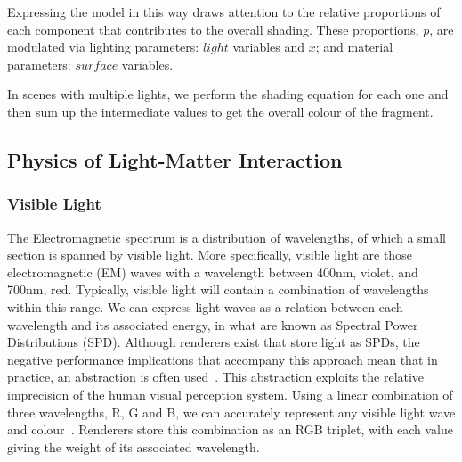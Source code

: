 Expressing the model in this way draws attention to the relative proportions of each component that contributes to the overall shading. These proportions, \begin{math}p\end{math}, are modulated via lighting parameters:  \begin{math}light\end{math} variables and \begin{math}x\end{math}; and material parameters: \begin{math}surface\end{math} variables.

In scenes with multiple lights, we perform the shading equation for each one and then sum up the intermediate values to get the overall colour of the fragment.

\subsection{Physics of Light-Matter Interaction} \label{PhysicsOfLightMatterInteraction}

\subsubsection{Visible Light}

The Electromagnetic spectrum is a distribution of wavelengths, of which a small section is spanned by visible light. More specifically, visible light are those electromagnetic (EM) waves with a wavelength between 400nm, violet, and 700nm, red. Typically, visible light will contain a combination of wavelengths within this range. We can express light waves as a relation between each wavelength and its associated energy, in what are known as Spectral Power Distributions (SPD). Although renderers exist that store light as SPDs, the negative performance implications that accompany this approach mean that in practice, an abstraction is often used~\cite{SpectralRendering}. This abstraction exploits the relative imprecision of the human visual perception system. Using a linear combination of three wavelengths, R, G and B, we can accurately represent any visible light wave and colour~\cite{RGBColours}. Renderers store this combination as an RGB triplet, with each value giving the weight of its associated wavelength.

